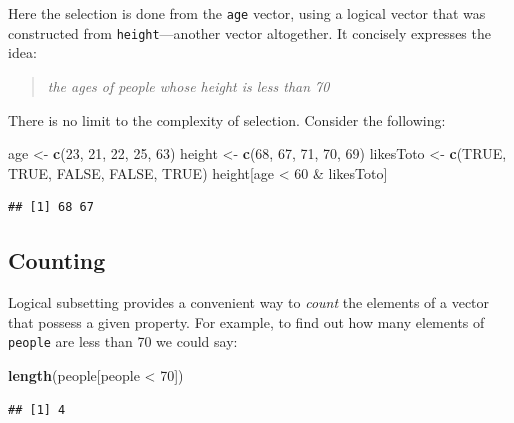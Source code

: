 \documentclass[]{book}
\makeatletter
\newenvironment{Shaded}{\begin{snugshade}}{\end{snugshade}}
\newcommand{\KeywordTok}[1]{\textcolor[rgb]{0.13,0.29,0.53}{\textbf{{#1}}}}
\newcommand{\DecValTok}[1]{\textcolor[rgb]{0.00,0.00,0.81}{{#1}}}
\newcommand{\StringTok}[1]{\textcolor[rgb]{0.31,0.60,0.02}{{#1}}}
\newcommand{\OtherTok}[1]{\textcolor[rgb]{0.56,0.35,0.01}{{#1}}}
\newcommand{\NormalTok}[1]{{#1}}
\newenvironment{kframe}{%
\medskip{}
\setlength{\fboxsep}{.8em}
 \def\at@end@of@kframe{}%
 \ifinner\ifhmode%
  \def\at@end@of@kframe{\end{minipage}}%
  \begin{minipage}{\columnwidth}%
 \fi\fi%
 \def\FrameCommand##1{\hskip\@totalleftmargin \hskip-\fboxsep
 \colorbox{shadecolor}{##1}\hskip-\fboxsep
     \hskip-\linewidth \hskip-\@totalleftmargin \hskip\columnwidth}%
 \MakeFramed {\advance\hsize-\width
   \@totalleftmargin\z@ \linewidth\hsize
   \@setminipage}}%
 {\par\unskip\endMakeFramed%
 \at@end@of@kframe}
\renewenvironment{Shaded}{\begin{kframe}}{\end{kframe}}
\theoremstyle{definition}
\theoremstyle{definition}
\theoremstyle{remark}
\makeatother
\begin{document}
Here the selection is done from the \texttt{age} vector, using a logical
vector that was constructed from \texttt{height}---another vector
altogether. It concisely expresses the idea:

\begin{quote}
\emph{the ages of people whose height is less than 70}
\end{quote}

There is no limit to the complexity of selection. Consider the
following:

\begin{Shaded}
\begin{Highlighting}[]
\NormalTok{age <-}\StringTok{ }\KeywordTok{c}\NormalTok{(}\DecValTok{23}\NormalTok{, }\DecValTok{21}\NormalTok{, }\DecValTok{22}\NormalTok{, }\DecValTok{25}\NormalTok{, }\DecValTok{63}\NormalTok{)}
\NormalTok{height <-}\StringTok{ }\KeywordTok{c}\NormalTok{(}\DecValTok{68}\NormalTok{, }\DecValTok{67}\NormalTok{, }\DecValTok{71}\NormalTok{, }\DecValTok{70}\NormalTok{, }\DecValTok{69}\NormalTok{)}
\NormalTok{likesToto <-}\StringTok{ }\KeywordTok{c}\NormalTok{(}\OtherTok{TRUE}\NormalTok{, }\OtherTok{TRUE}\NormalTok{, }\OtherTok{FALSE}\NormalTok{, }\OtherTok{FALSE}\NormalTok{, }\OtherTok{TRUE}\NormalTok{)}
\NormalTok{height[age <}\StringTok{ }\DecValTok{60} \NormalTok{&}\StringTok{ }\NormalTok{likesToto]}
\end{Highlighting}
\end{Shaded}

\begin{verbatim}
## [1] 68 67
\end{verbatim}

\subsection{Counting}\label{counting}

Logical subsetting provides a convenient way to \emph{count} the
elements of a vector that possess a given property. For example, to find
out how many elements of \texttt{people} are less than 70 we could say:

\begin{Shaded}
\begin{Highlighting}[]
\KeywordTok{length}\NormalTok{(people[people <}\StringTok{ }\DecValTok{70}\NormalTok{])}
\end{Highlighting}
\end{Shaded}

\begin{verbatim}
## [1] 4
\end{verbatim}
\end{document}
